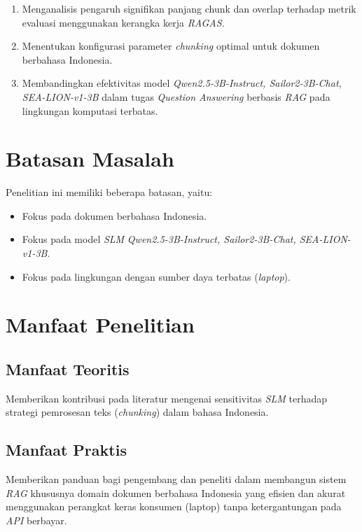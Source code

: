 \begin{enumerate}
    \item Menganalisis pengaruh signifikan panjang chunk dan overlap terhadap metrik evaluasi menggunakan kerangka kerja \textit{RAGAS}.
    \item Menentukan konfigurasi parameter \textit{chunking} optimal untuk dokumen berbahasa Indonesia.
    \item Membandingkan efektivitas model \textit{Qwen2.5-3B-Instruct, Sailor2-3B-Chat, SEA-LION-v1-3B} dalam tugas \textit{Question Answering} berbasis \textit{RAG} pada lingkungan komputasi terbatas.
\end{enumerate}

\section{Batasan Masalah}
Penelitian ini memiliki beberapa batasan, yaitu:
\begin{itemize}
    \item Fokus pada dokumen berbahasa Indonesia.
    \item Fokus pada model \textit{SLM} \textit{Qwen2.5-3B-Instruct, Sailor2-3B-Chat, SEA-LION-v1-3B}.
    \item Fokus pada lingkungan dengan sumber daya terbatas (\textit{laptop}).
\end{itemize}

\section{Manfaat Penelitian}
\subsection{Manfaat Teoritis}
Memberikan kontribusi pada literatur mengenai sensitivitas \textit{SLM} terhadap strategi pemrosesan teks (\textit{chunking}) dalam bahasa Indonesia.
\subsection{Manfaat Praktis}
Memberikan panduan bagi pengembang dan peneliti dalam membangun sistem \textit{RAG} khususnya domain dokumen berbahasa Indonesia yang efisien dan akurat menggunakan perangkat keras konsumen (laptop) tanpa ketergantungan pada \textit{API} berbayar.

